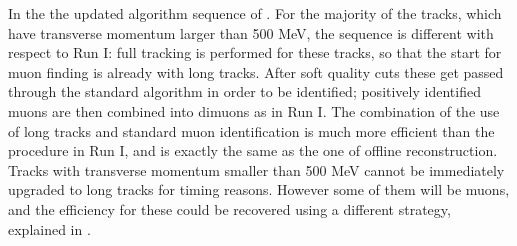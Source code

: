 In the the \runtwo updated \hltone algorithm sequence of .
For the majority of the tracks, which have transverse momentum larger than 500 MeV, the sequence is different with respect to
Run I: full tracking is performed for these tracks, so that the start for muon finding is already with long tracks.
After soft quality cuts these get passed through the standard \isMuon algorithm in order to be identified;
positively identified muons are then combined into dimuons as in Run I.
The combination of the use of long tracks and standard muon identification is much more efficient than the
procedure in Run I, and is exactly the same as the one of offline reconstruction.
Tracks with transverse momentum smaller than 500 MeV cannot be immediately upgraded to long tracks for timing reasons.
However some of them will be muons, and the efficiency for these could be recovered using a different strategy,
explained in .
